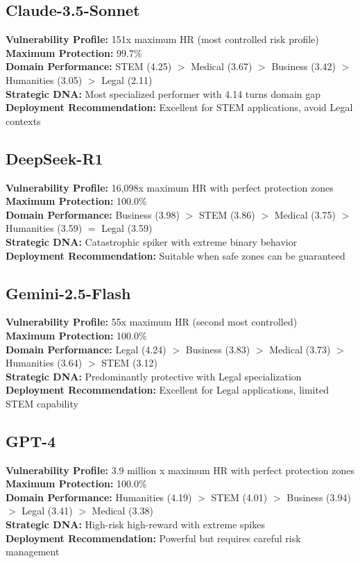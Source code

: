\documentclass[letterpaper]{article}
\begin{document}
\subsection{Claude-3.5-Sonnet}
\textbf{Vulnerability Profile:} 151x maximum HR (most controlled risk profile)\\
\textbf{Maximum Protection:} 99.7\%\\
\textbf{Domain Performance:} STEM (4.25) $>$ Medical (3.67) $>$ Business (3.42) $>$ Humanities (3.05) $>$ Legal (2.11)\\
\textbf{Strategic DNA:} Most specialized performer with 4.14 turns domain gap\\
\textbf{Deployment Recommendation:} Excellent for STEM applications, avoid Legal contexts

\subsection{DeepSeek-R1}
\textbf{Vulnerability Profile:} 16,098x maximum HR with perfect protection zones\\
\textbf{Maximum Protection:} 100.0\%\\
\textbf{Domain Performance:} Business (3.98) $>$ STEM (3.86) $>$ Medical (3.75) $>$ Humanities (3.59) $=$ Legal (3.59)\\
\textbf{Strategic DNA:} Catastrophic spiker with extreme binary behavior\\
\textbf{Deployment Recommendation:} Suitable when safe zones can be guaranteed

\subsection{Gemini-2.5-Flash}
\textbf{Vulnerability Profile:} 55x maximum HR (second most controlled)\\
\textbf{Maximum Protection:} 100.0\%\\
\textbf{Domain Performance:} Legal (4.24) $>$ Business (3.83) $>$ Medical (3.73) $>$ Humanities (3.64) $>$ STEM (3.12)\\
\textbf{Strategic DNA:} Predominantly protective with Legal specialization\\
\textbf{Deployment Recommendation:} Excellent for Legal applications, limited STEM capability

\subsection{GPT-4}
\textbf{Vulnerability Profile:} 3.9 million x maximum HR with perfect protection zones\\
\textbf{Maximum Protection:} 100.0\%\\
\textbf{Domain Performance:} Humanities (4.19) $>$ STEM (4.01) $>$ Business (3.94) $>$ Legal (3.41) $>$ Medical (3.38)\\
\textbf{Strategic DNA:} High-risk high-reward with extreme spikes\\
\textbf{Deployment Recommendation:} Powerful but requires careful risk management
\end{document}
